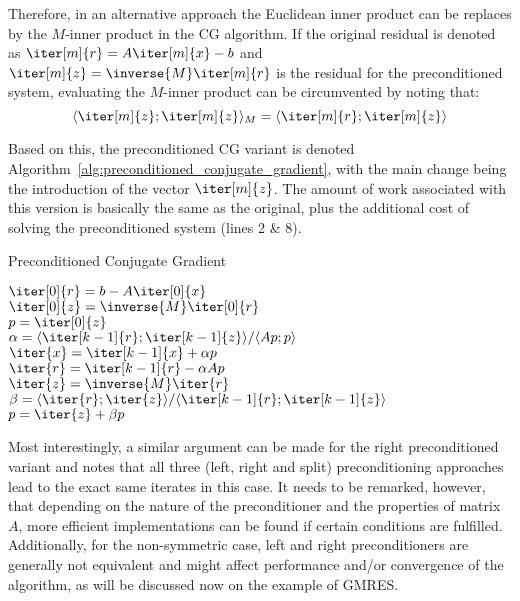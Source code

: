 \noindent Therefore, in an alternative approach the Euclidean inner product can be replaces by the $M$-inner product in the CG algorithm. If the original residual is denoted as $\iter[m]{r}=A\iter[m]{x}-b$ and $\iter[m]{z}=\inverse{M}\iter[m]{r}$ is the residual for the preconditioned system, evaluating the $M$-inner product can be circumvented by noting that:
\begin{equation}
    \langle \iter[m]{z};\iter[m]{z} \rangle_M = \langle \iter[m]{r};\iter[m]{z} \rangle
\end{equation}

\noindent Based on this, the preconditioned CG variant is denoted Algorithm~\hyperref[alg:preconditioned_conjugate_gradient]{\ref{alg:preconditioned_conjugate_gradient}}, with the main change being the introduction of the vector $\iter[m]{z}$. The amount of work associated with this version is basically the same as the original, plus the additional cost of solving the preconditioned system (lines 2 \& 8).

\begin{algorithm}[h]
  \caption{Preconditioned Conjugate Gradient}
  \label{alg:preconditioned_conjugate_gradient}
  \SetAlgoLined
  \DontPrintSemicolon
  $\iter[0]{r} = b-A\iter[0]{x}$ \\
  $\iter[0]{z} = \inverse{M}\iter[0]{r}$ \\
  $p = \iter[0]{z}$ \\
   {
    $\alpha = \langle \iter[k-1]{r};\iter[k-1]{z} \rangle / \langle Ap;p \rangle$ \\
    $\iter{x} = \iter[k-1]{x}+\alpha p$ \\
    $\iter{r} = \iter[k-1]{r} - \alpha Ap$ \\
    $\iter{z} = \inverse{M}\iter{r}$ \\
    $\beta = \langle \iter{r};\iter{z} \rangle / \langle \iter[k-1]{r};\iter[k-1]{z} \rangle$ \\
    $p = \iter{z} + \beta p$ \\
  }
\end{algorithm}

Most interestingly, a similar argument can be made for the right preconditioned variant and \cite{saad_iterative_2003} notes that all three (left, right and split) preconditioning approaches lead to the exact same iterates in this case. It needs to be remarked, however, that depending on the nature of the preconditioner and the properties of matrix $A$, more efficient implementations can be found if certain conditions are fulfilled. Additionally, for the non-symmetric case, left and right preconditioners are generally not equivalent and might affect performance and/or convergence of the algorithm, as will be discussed now on the example of GMRES.

